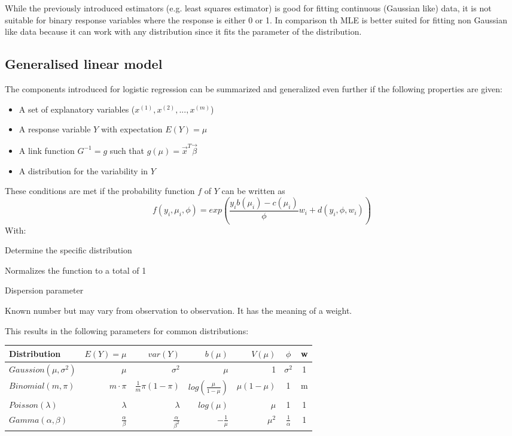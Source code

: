 While the previously introduced estimators (e.g. least squares estimator) is good for fitting continuous (Gaussian like) data, it is not suitable for binary response variables where the response is either 0 or 1. In comparison th MLE is better suited for fitting non Gaussian like data because it can work with any distribution since it fits the parameter of the distribution.

\subsection{Generalised linear model}

The components introduced for logistic regression can be summarized and generalized even further if the following properties are given:

\begin{itemize}
	\tightlist
	\item A set of explanatory variables ($x^{(1)}, x^{(2)}, ..., x^{(m)}$)
	\item A response variable $Y$ with expectation $E(Y)=\mu$
	\item A link function $G^{-1} = g$ such that $g(\mu) = \vec{x}^T \vec{\beta}$
	\item A distribution for the variability in $Y$
\end{itemize}

These conditions are met if the probability function $f$ of $Y$ can be written as
\begin{equation*}
f(y_i, \mu_i, \phi) = exp(\frac{y_i b(\mu_i)-c(\mu_i)}{\phi}w_i+d(y_i, \phi, w_i))
\end{equation*}
With:
\begin{description}
	\tightlist
	\item[$b()$ and $c()$] Determine the specific distribution
	\item[$d()$] Normalizes the function to a total of 1
	\item[$\phi$] Dispersion parameter
	\item[$w_i$] Known number but may vary from observation to observation.	It has the meaning of a weight.
\end{description}

This results in the following parameters for common distributions:

\begin{tabular}{l||rr|rrcc}
	\hline 
	Distribution & $E(Y) = \mu$ & $var(Y)$ & $b(\mu)$ & $V(\mu)$ & $\phi$ & w \\
	\hline
	$Gaussion(\mu, \sigma^2)$ & $\mu$ & $\sigma^2$ & $\mu$ & 1 & $\sigma^2$ & 1\\
	$Binomial(m, \pi)$ & $m\cdot\pi$ & $\frac{1}{m}\pi(1-\pi)$ & $log(\frac{\mu}{1-\mu})$ & $\mu(1-\mu)$ & 1 & m\\
	$Poisson(\lambda)$ & $\lambda$ & $\lambda$ & $log(\mu)$ & $\mu$ & 1 & 1\\
	$Gamma(\alpha, \beta)$ & $\frac{\alpha}{\beta}$ & $\frac{\alpha}{\beta^2}$ & $-\frac{1}{\mu}$ & $\mu^2$ & $\frac{1}{\alpha}$ & 1\\
	\hline
\end{tabular}

